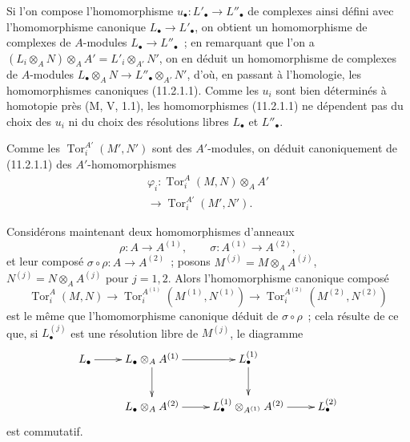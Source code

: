 Si l'on compose l'homomorphisme $u_\bullet:L'_\bullet\to L''_\bullet$ de
complexes ainsi défini avec l'homomorphisme canonique
$L_\bullet\to L'_\bullet$, on obtient un homomorphisme de complexes de
$A$-modules $L_\bullet\to L''_\bullet$~; en remarquant que l'on a
$(L_i\otimes_AN)\otimes_AA'=L'_i\otimes_{A'}N'$, on en déduit un
homomorphisme de complexes de $A$-modules
$L_\bullet\otimes_AN\to L''_\bullet\otimes_{A'}N'$, d'où, en passant à
l'homologie, les homomorphismes canoniques (11.2.1.1). Comme les $u_i$ sont
bien déterminés à homotopie près (M, V, 1.1), les homomorphismes (11.2.1.1)
ne dépendent pas du choix des $u_i$ ni du choix des résolutions libres
$L_\bullet$ et $L''_\bullet$.

\begin{sloppypar}
Comme les $\operatorname{Tor}_i^{A'}(M',N')$ sont des $A'$-modules, on déduit
canoniquement de (11.2.1.1) des $A'$-homomorphismes
\begin{equation}
\begin{gathered}
\varphi_i:\operatorname{Tor}_i^A(M,N)\otimes_AA'\\[-2pt]
\longrightarrow\operatorname{Tor}_i^{A'}(M',N').
\end{gathered}
\label{IV.11.2.1.5-fr}
\tag{11.2.1.5}
\end{equation}
\end{sloppypar}

Considérons maintenant deux homomorphismes d'anneaux
\[
\rho:A\to A^{(1)},\qquad \sigma:A^{(1)}\to A^{(2)},
\]
et leur composé $\sigma\circ\rho:A\to A^{(2)}$~; posons
$M^{(j)}=M\otimes_AA^{(j)}$, $N^{(j)}=N\otimes_AA^{(j)}$ pour $j=1,2$.
Alors l'homomorphisme canonique composé
\[
\operatorname{Tor}_i^A(M,N)\to
\operatorname{Tor}_i^{A^{(1)}}(M^{(1)},N^{(1)})\to
\operatorname{Tor}_i^{A^{(2)}}(M^{(2)},N^{(2)})
\]
est le même que l'homomorphisme canonique déduit de $\sigma\circ\rho$~;
cela résulte de ce que, si $L_\bullet^{(j)}$ est une résolution libre de
$M^{(j)}$, le diagramme
\[
\xymatrix{
L_\bullet\ar[r]&L_\bullet\otimes_AA^{(1)}\ar[r]\ar[d]&
L_\bullet^{(1)}\ar[d]\\
&L_\bullet\otimes_AA^{(2)}\ar[r]&
L_\bullet^{(1)}\otimes_{A^{(1)}}A^{(2)}\ar[r]&L_\bullet^{(2)}
}
\]
est commutatif.

